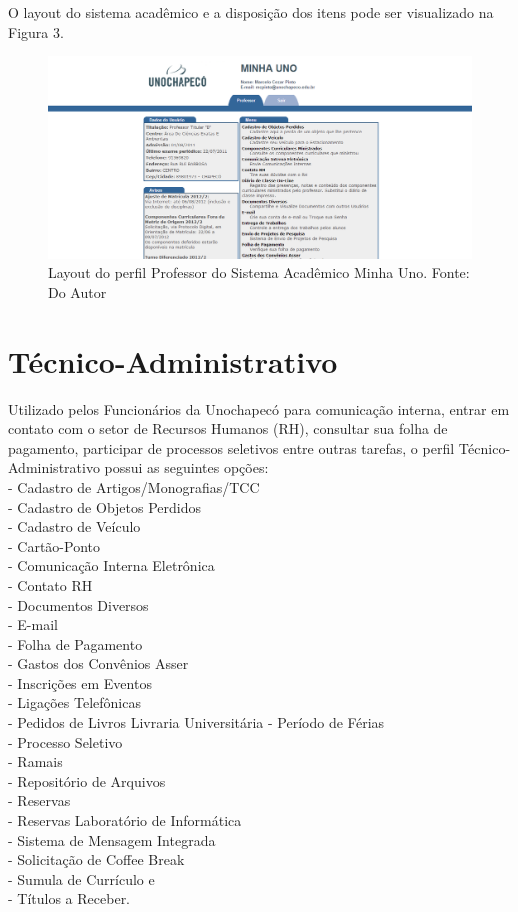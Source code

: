 O layout do sistema acadêmico e a disposição dos itens pode ser visualizado na Figura 3.


\begin{figure}[!htb]
     \centering
     \includegraphics[scale=0.4]{imagens/professor.png}
     \caption[Layout do Sistema - Perfil Professor]{Layout do perfil Professor do Sistema Acadêmico Minha Uno. Fonte: Do Autor}
\end{figure}

\newpage

\section{Técnico-Administrativo}
Utilizado pelos Funcionários da Unochapecó para comunicação interna, entrar em contato com o setor de Recursos Humanos (RH),
consultar sua folha de pagamento, participar de processos seletivos entre outras tarefas, o perfil Técnico-Administrativo
possui as seguintes opções: \\
- Cadastro de Artigos/Monografias/TCC \\
- Cadastro de Objetos Perdidos \\
- Cadastro de Veículo \\
- Cartão-Ponto \\
- Comunicação Interna Eletrônica \\
- Contato RH \\
- Documentos Diversos \\
- E-mail \\
- Folha de Pagamento \\
- Gastos dos Convênios Asser \\
- Inscrições em Eventos \\
- Ligações Telefônicas \\
- Pedidos de Livros Livraria Universitária
- Período de Férias \\
- Processo Seletivo \\
- Ramais \\
- Repositório de Arquivos \\
- Reservas \\
- Reservas Laboratório de Informática \\
- Sistema de Mensagem Integrada \\
- Solicitação de Coffee Break \\
- Sumula de Currículo e \\
- Títulos a Receber. \\

